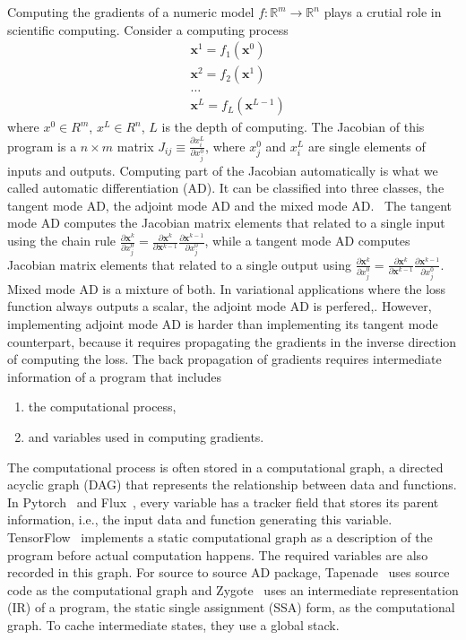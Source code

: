 \documentclass[aps,twocolumn,longbibliography,english,superscriptaddress]{revtex4-1}
\newcommand{\<}{\langle}
\renewcommand{\>}{\rangle}
\newcommand{\vx}{{\mathbf{x}}}
\theoremstyle{definition}\newtheorem{definition}{\textit{Definition}}
\begin{document}
    Computing the gradients of a numeric model $f : \mathbb{R}^m \rightarrow \mathbb{R}^n$ plays a crutial role in scientific computing. Consider a computing process
\begin{align*}
    &\vx^1 = f_1(\vx^0)\\
    &\vx^2 = f_2(\vx^1)\\
    &\ldots\\
    &\vx^L = f_L(\vx^{L-1})
\end{align*}
where $x^0\in R^m$, $x^L\in R^n$, $L$ is the depth of computing.
The Jacobian of this program is a $n\times m$ matrix $J_{ij} \equiv \frac{\partial x^L_i}{\partial x_j^0}$, where $x_j^0$ and $x_i^L$ are single elements of inputs and outputs.
Computing part of the Jacobian automatically is what we called automatic differentiation (AD). It can be classified into three classes, the tangent mode AD, the adjoint mode AD and the mixed mode AD.~\cite{Hascoet2013}
The tangent mode AD computes the Jacobian matrix elements that related to a single input using the chain rule $\frac{\partial \vx^k}{\partial x^0_j} = \frac{\partial \vx^k}{\partial \vx^{k-1}}\frac{\partial \vx^{k-1}}{\partial x^0_j}$, while a tangent mode AD computes Jacobian matrix elements that related to a single output using $\frac{\partial \vx^k}{\partial x^0_j} = \frac{\partial \vx^k}{\partial \vx^{k-1}}\frac{\partial \vx^{k-1}}{\partial x^0_j}$. Mixed mode AD is a mixture of both.
    In variational applications where the loss function always outputs a scalar, the adjoint mode AD is perfered,.
However, implementing adjoint mode AD is harder than implementing its tangent mode counterpart, because it requires propagating the gradients in the inverse direction of computing the loss. The back propagation of gradients requires intermediate information of a program that includes
\begin{enumerate}
    \item the computational process,
    \item and variables used in computing gradients.
\end{enumerate}
    The computational process is often stored in a computational graph, a directed acyclic graph (DAG) that represents the relationship between data and functions. In Pytorch~\cite{Paszke2017} and Flux~\cite{Innes2018a}, every variable has a tracker field that stores its parent information, i.e., the input data and function generating this variable. TensorFlow~\cite{Tensorflow2015} implements a static computational graph as a description of the program before actual computation happens. The required variables are also recorded in this graph.
    For source to source AD package, Tapenade~\cite{Hascoet2013} uses source code as the computational graph and Zygote~\cite{Innes2018, Innes2019} uses an intermediate representation (IR) of a program, the static single assignment (SSA) form, as the computational graph. To cache intermediate states, they use a global stack.
\end{document}
